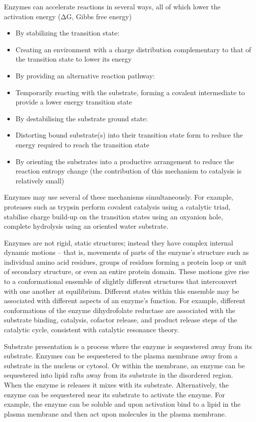 Enzymes can accelerate reactions in several ways, all of which lower the activation energy (ΔG, Gibbs free energy)

\begin{itemize}
\tightlist
\item
  By stabilizing the transition state:
\item
  Creating an environment with a charge distribution complementary to that of the transition state to lower its energy
\item
  By providing an alternative reaction pathway:
\item
  Temporarily reacting with the substrate, forming a covalent intermediate to provide a lower energy transition state
\item
  By destabilising the substrate ground state:
\item
  Distorting bound substrate(s) into their transition state form to reduce the energy required to reach the transition state
\item
  By orienting the substrates into a productive arrangement to reduce the reaction entropy change (the contribution of this mechanism to catalysis is relatively small)
\end{itemize}

Enzymes may use several of these mechanisms simultaneously. For example, proteases such as trypsin perform covalent catalysis using a catalytic triad, stabilise charge build-up on the transition states using an oxyanion hole, complete hydrolysis using an oriented water substrate.

Enzymes are not rigid, static structures; instead they have complex internal dynamic motions -- that is, movements of parts of the enzyme's structure such as individual amino acid residues, groups of residues forming a protein loop or unit of secondary structure, or even an entire protein domain. These motions give rise to a conformational ensemble of slightly different structures that interconvert with one another at equilibrium. Different states within this ensemble may be associated with different aspects of an enzyme's function. For example, different conformations of the enzyme dihydrofolate reductase are associated with the substrate binding, catalysis, cofactor release, and product release steps of the catalytic cycle, consistent with catalytic resonance theory.

Substrate presentation is a process where the enzyme is sequestered away from its substrate. Enzymes can be sequestered to the plasma membrane away from a substrate in the nucleus or cytosol. Or within the membrane, an enzyme can be sequestered into lipid rafts away from its substrate in the disordered region. When the enzyme is releases it mixes with its substrate. Alternatively, the enzyme can be sequestered near its substrate to activate the enzyme. For example, the enzyme can be soluble and upon activation bind to a lipid in the plasma membrane and then act upon molecules in the plasma membrane.

